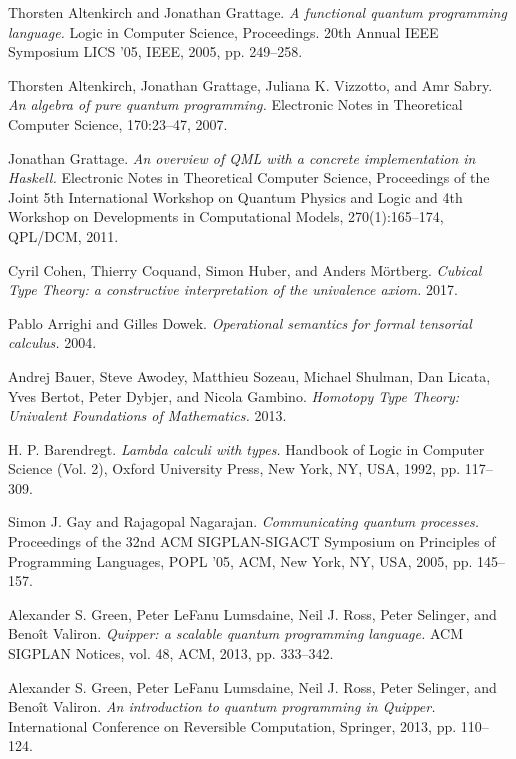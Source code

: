 \documentclass{article}
\theoremstyle{definition}
\begin{document}
\begin{thebibliography}{99}

Thorsten Altenkirch and Jonathan Grattage.
\textit{A functional quantum programming language.}
Logic in Computer Science, Proceedings. 20th Annual IEEE Symposium LICS '05, IEEE, 2005, pp. 249–258.

Thorsten Altenkirch, Jonathan Grattage, Juliana K. Vizzotto, and Amr Sabry.
\textit{An algebra of pure quantum programming.}
Electronic Notes in Theoretical Computer Science, 170:23–47, 2007.

Jonathan Grattage.
\textit{An overview of QML with a concrete implementation in Haskell.}
Electronic Notes in Theoretical Computer Science, Proceedings of the Joint 5th International Workshop on Quantum Physics and Logic and 4th Workshop on Developments in Computational Models, 270(1):165–174, QPL/DCM, 2011.

Cyril Cohen, Thierry Coquand, Simon Huber, and Anders Mörtberg.
\textit{Cubical Type Theory: a constructive interpretation of the univalence axiom.}
2017.

Pablo Arrighi and Gilles Dowek.
\textit{Operational semantics for formal tensorial calculus.}
2004.

Andrej Bauer, Steve Awodey, Matthieu Sozeau, Michael Shulman, Dan Licata, Yves Bertot, Peter Dybjer, and Nicola Gambino.
\textit{Homotopy Type Theory: Univalent Foundations of Mathematics.}
2013.

H. P. Barendregt.
\textit{Lambda calculi with types.}
Handbook of Logic in Computer Science (Vol. 2), Oxford University Press, New York, NY, USA, 1992, pp. 117–309.

Simon J. Gay and Rajagopal Nagarajan.
\textit{Communicating quantum processes.}
Proceedings of the 32nd ACM SIGPLAN-SIGACT Symposium on Principles of Programming Languages, POPL ’05, ACM, New York, NY, USA, 2005, pp. 145–157.

Alexander S. Green, Peter LeFanu Lumsdaine, Neil J. Ross, Peter Selinger, and Benoît Valiron.
\textit{Quipper: a scalable quantum programming language.}
ACM SIGPLAN Notices, vol. 48, ACM, 2013, pp. 333–342.

Alexander S. Green, Peter LeFanu Lumsdaine, Neil J. Ross, Peter Selinger, and Benoît Valiron.
\textit{An introduction to quantum programming in Quipper.}
International Conference on Reversible Computation, Springer, 2013, pp. 110–124.


\end{thebibliography}
\end{document}

